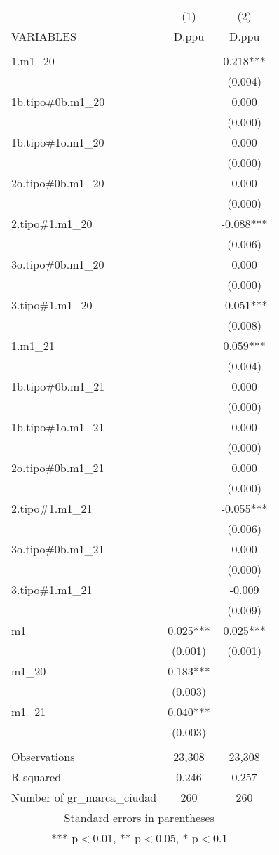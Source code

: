 \begin{tabular}{lcc} \hline
 & (1) & (2) \\
VARIABLES & D.ppu & D.ppu \\ \hline
 &  &  \\
1.m1\_20 &  & 0.218*** \\
 &  & (0.004) \\
1b.tipo\#0b.m1\_20 &  & 0.000 \\
 &  & (0.000) \\
1b.tipo\#1o.m1\_20 &  & 0.000 \\
 &  & (0.000) \\
2o.tipo\#0b.m1\_20 &  & 0.000 \\
 &  & (0.000) \\
2.tipo\#1.m1\_20 &  & -0.088*** \\
 &  & (0.006) \\
3o.tipo\#0b.m1\_20 &  & 0.000 \\
 &  & (0.000) \\
3.tipo\#1.m1\_20 &  & -0.051*** \\
 &  & (0.008) \\
1.m1\_21 &  & 0.059*** \\
 &  & (0.004) \\
1b.tipo\#0b.m1\_21 &  & 0.000 \\
 &  & (0.000) \\
1b.tipo\#1o.m1\_21 &  & 0.000 \\
 &  & (0.000) \\
2o.tipo\#0b.m1\_21 &  & 0.000 \\
 &  & (0.000) \\
2.tipo\#1.m1\_21 &  & -0.055*** \\
 &  & (0.006) \\
3o.tipo\#0b.m1\_21 &  & 0.000 \\
 &  & (0.000) \\
3.tipo\#1.m1\_21 &  & -0.009 \\
 &  & (0.009) \\
m1 & 0.025*** & 0.025*** \\
 & (0.001) & (0.001) \\
m1\_20 & 0.183*** &  \\
 & (0.003) &  \\
m1\_21 & 0.040*** &  \\
 & (0.003) &  \\
 &  &  \\
Observations & 23,308 & 23,308 \\
R-squared & 0.246 & 0.257 \\
 Number of gr\_marca\_ciudad & 260 & 260 \\ \hline
\multicolumn{3}{c}{ Standard errors in parentheses} \\
\multicolumn{3}{c}{ *** p$<$0.01, ** p$<$0.05, * p$<$0.1} \\
\end{tabular}
